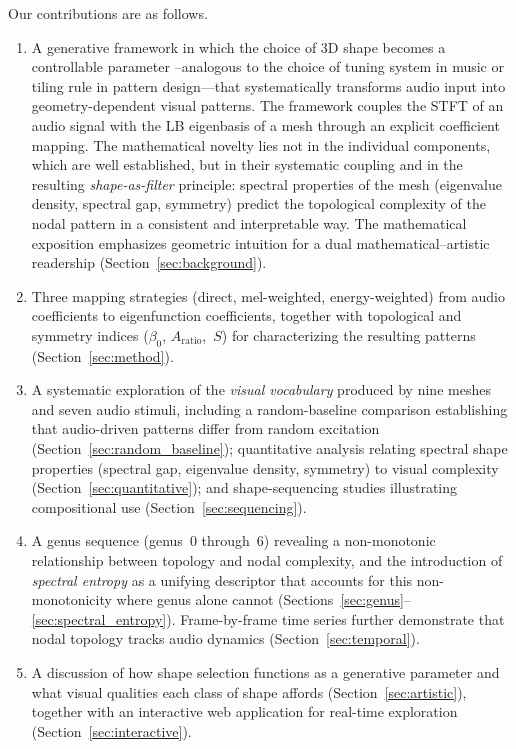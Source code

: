 \documentclass[]{interact}
\theoremstyle{plain}
\theoremstyle{definition}
\theoremstyle{remark}
\begin{document}
Our contributions are as follows.
\begin{enumerate}
\item A generative framework in which the choice of 3D shape becomes a controllable parameter --analogous to the choice of tuning system in music or tiling rule in pattern design---that systematically transforms audio input into geometry-dependent visual patterns. The framework couples the STFT of an audio signal with the LB eigenbasis of a mesh through an explicit coefficient mapping. The mathematical novelty lies not in the individual components, which are well established, but in their systematic coupling and in the resulting \emph{shape-as-filter} principle: spectral properties of the mesh (eigenvalue density, spectral gap, symmetry) predict the topological complexity of the nodal pattern in a consistent and interpretable way. The mathematical exposition emphasizes geometric intuition for a dual mathematical--artistic readership (Section~\ref{sec:background}).

\item Three mapping strategies (direct, mel-weighted, energy-weighted) from audio coefficients to eigenfunction coefficients, together with topological and symmetry indices ($\beta_0$, $A_{\mathrm{ratio}}$,~$S$) for characterizing the resulting patterns (Section~\ref{sec:method}).

\item A systematic exploration of the \emph{visual vocabulary} produced by nine meshes and seven audio stimuli, including a random-baseline comparison establishing that audio-driven patterns differ from random excitation (Section~\ref{sec:random_baseline}); quantitative analysis relating spectral shape properties (spectral gap, eigenvalue density, symmetry) to visual complexity (Section~\ref{sec:quantitative}); and shape-sequencing studies illustrating compositional use (Section~\ref{sec:sequencing}).

\item A genus sequence (genus~0 through~6) revealing a non-monotonic relationship between topology and nodal complexity, and the introduction of \emph{spectral entropy} as a unifying descriptor that accounts for this non-monotonicity where genus alone cannot (Sections~\ref{sec:genus}--\ref{sec:spectral_entropy}). Frame-by-frame time series further demonstrate that nodal topology tracks audio dynamics (Section~\ref{sec:temporal}).

\item A discussion of how shape selection functions as a generative parameter and what visual qualities each class of shape affords (Section~\ref{sec:artistic}), together with an interactive web application for real-time exploration (Section~\ref{sec:interactive}).
\end{enumerate}
\end{document}

